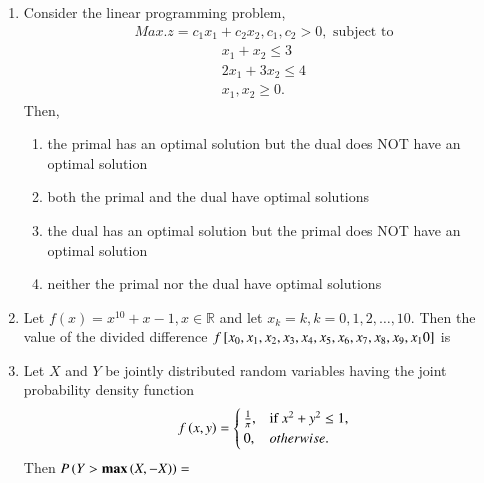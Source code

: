 \documentclass[journal]{IEEEtran}
\begin{document}
\begin{enumerate}
\item Consider the linear programming problem, 
\begin{align*}
    Max. z=c_1 x_1 + c_2 x_2, c_1, c_2>0, \text{ subject to}
\end{align*}
\begin{align*}    
    x_1+x_2 \leq 3\\
    2x_1+3x_2 \leq 4\\
    x_1,x_2 \geq 0.
\end{align*}
Then,
\begin{enumerate}
    \item the primal has an optimal solution but the dual does NOT have an optimal solution
    \item both the primal and the dual have optimal solutions 
    \item the dual has an optimal solution but the primal does NOT have an optimal solution
    \item neither the primal nor the dual have optimal solutions
\end{enumerate}

\item Let $f(x)=x^{10}+x-1, x \in \mathbb R$ and let $x_k=k, k=0,1,2,\dots,10$. Then the value of the divided difference $f{}\left[x_0,x_1,x_2,x_3,x_4,x_5,x_6,x_7,x_8,x_9,x_10\right]$ is
\begin{enumerate}
\end{enumerate}

\item Let $X$ and $Y$ be jointly distributed random variables having the joint probability density function
\begin{align*}
    f\left(x,y\right)= \begin{cases} 
\frac{1}{\pi}, & \text{if } x^2+y^2 \leq 1,\\
0, & otherwise. \\
\end{cases}
\end{align*}
Then $P\left(Y>\textbf{max}\left(X,-X\right)\right)=$
\begin{enumerate}
\end{enumerate}


\end{enumerate}
\end{document}
